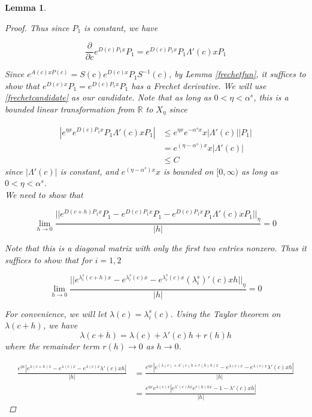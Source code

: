 \documentclass[12pt]{article}
\def\R{{\mathbb R}}
\newtheorem{lemma}{Lemma}
\begin{document}
\begin{lemma}
\begin{proof}
Thus since $P_1$ is constant, we have

\begin{equation}\label{frechetcandidate}
\frac{\partial}{\partial c} e^{D(c) P_1 x} P_1 = e^{D(c) P_1 x} P_1 \Lambda'(c) x P_1
\end{equation}

Since $e^{A(c)x P(c)} = S(c) e^{D(c) x} P_1 S^{-1}(c)$, by Lemma \ref{frechetfun}, it suffices to show that $e^{D(c) x} P_1 = e^{D(c) P_1 x} P_1$ has a Frechet derivative. We will use \eqref{frechetcandidate} as our candidate. Note that as long as $0 < \eta < \alpha^s$, this is a bounded linear transformation from $\R$ to $X_\eta$ since

\begin{align*}
|e^{\eta x} e^{D(c) P_1 x} P_1 \Lambda'(c) x P_1| &\leq e^{\eta x} e^{-\alpha^s x} x |\Lambda'(c)||P_1| \\
&= e^{(\eta -\alpha^s) x} x |\Lambda'(c)| \\
&\leq C 
\end{align*}
since $|\Lambda'(c)|$ is constant, and $e^{(\eta -\alpha^s) x} x$ is bounded on $[0, \infty)$ as long as $0 < \eta < \alpha^s$.\\

We need to show that

\[
\lim_{h \rightarrow 0} \frac{|| e^{D(c+h) P_1 x} P_1 - e^{D(c) P_1 x} P_1 - e^{D(c) P_1 x} P_1 \Lambda'(c) x P_1||_\eta}{|h|} = 0
\]

Note that this is a diagonal matrix with only the first two entries nonzero. Thus it suffices to show that for $i = 1, 2$

\[
\lim_{h \rightarrow 0} \frac{|| e^{\lambda^s_i(c+h) x} - e^{\lambda^s_i(c) x} 
- e^{\lambda^s_i(c) x} (\lambda^s_i)'(c)x h ||_\eta}{|h|} = 0
\]

For convenience, we will let $\lambda(c) = \lambda^s_i(c)$. Using the Taylor theorem on $\lambda(c+h)$, we have
\[ 
\lambda(c+h) = \lambda(c) + \lambda'(c)h + r(h)h
\]
where the remainder term $r(h) \rightarrow 0$ as $h \rightarrow 0$.

\begin{align*}
\frac{e^{\eta x}| e^{\lambda(c+h) x} - e^{\lambda(c) x} - e^{\lambda(c) x} \lambda'(c)x h|}{|h|} &=
 \frac{e^{\eta x}| e^{(\lambda(c) + \lambda'(c)h + r(h)h) x} - e^{\lambda(c) x} - e^{\lambda(c) x} \lambda'(c)x h|}{|h|} \\
&= \frac{e^{\eta x} e^{\lambda(c)x}| e^{\lambda'(c)hx} e^{r(h)h x} - 1 - \lambda'(c)x h|}{|h|} 
\end{align*}


\end{proof}
\end{lemma}
\end{document}
